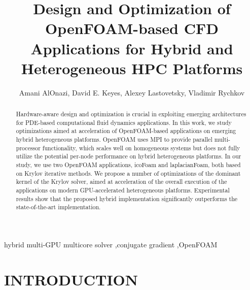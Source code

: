 \documentclass[3p,times]{elsarticle}
\begin{document}
\begin{frontmatter}







\title{Design and Optimization of OpenFOAM-based CFD Applications for Hybrid and Heterogeneous HPC Platforms}



\author{Amani AlOnazi, David E. Keyes, Alexey Lastovetsky, Vladimir Rychkov}

\address{Extreme Computing Research Center, KAUST, Thuwal 23955-6900, Saudi Arabia, \\
e-mail: \{amani.alonazi, david.keyes\}@kaust.edu.sa\\
Heterogeneous Computing Laboratory, UCD, Dublin 4, Ireland, \\
e-mail:\{alexey.lastovetsky, vladimir.rychkov\}@ucd.ie}

\begin{abstract}
Hardware-aware design and optimization is crucial in exploiting emerging architectures for PDE-based computational fluid dynamics applications. In this work, we study optimizations aimed at acceleration of OpenFOAM-based applications on emerging hybrid heterogeneous platforms. OpenFOAM uses MPI to provide parallel multi-processor functionality, which scales well on homogeneous systems but does not fully utilize the potential per-node performance on hybrid heterogeneous platforms. In our study, we use two OpenFOAM applications, icoFoam and laplacianFoam, both based on Krylov iterative methods. We propose a number of optimizations of the dominant kernel of the Krylov solver, aimed at acceleration of the overall execution of the applications on modern GPU-accelerated heterogeneous platforms. Experimental results show that the proposed hybrid implementation significantly outperforms the state-of-the-art implementation.


\end{abstract}

\begin{keyword}
hybrid multi-GPU multicore solver \sep conjugate gradient \sep OpenFOAM




\end{keyword}

\end{frontmatter}



\section{INTRODUCTION}
\label{INTRODUCTION}
\end{document}
